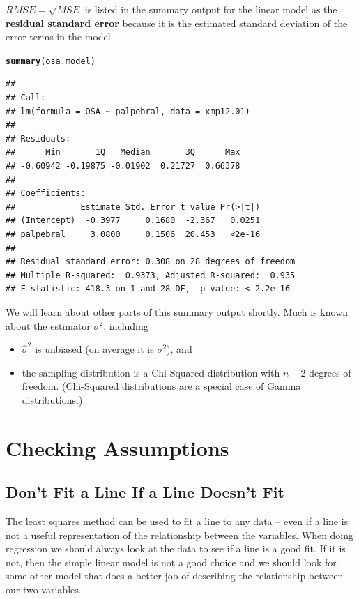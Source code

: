 \documentclass[twoside]{book}\usepackage[]{graphicx}\usepackage[]{xcolor}
\makeatletter
\newcommand{\hlstd}[1]{\textcolor[rgb]{0.345,0.345,0.345}{#1}}%
\newcommand{\hlkwd}[1]{\textcolor[rgb]{0.737,0.353,0.396}{\textbf{#1}}}%
\newenvironment{kframe}{%
 \def\at@end@of@kframe{}%
 \ifinner\ifhmode%
  \def\at@end@of@kframe{\end{minipage}}%
  \begin{minipage}{\columnwidth}%
 \fi\fi%
 \def\FrameCommand##1{\hskip\@totalleftmargin \hskip-\fboxsep
 \colorbox{shadecolor}{##1}\hskip-\fboxsep
     \hskip-\linewidth \hskip-\@totalleftmargin \hskip\columnwidth}%
 \MakeFramed {\advance\hsize-\width
   \@totalleftmargin\z@ \linewidth\hsize
   \@setminipage}}%
 {\par\unskip\endMakeFramed%
 \at@end@of@kframe}
\newenvironment{knitrout}{}{} %
\def\term#1{\textbf{#1}}
\makeatother
\begin{document}
$RMSE = \sqrt{MSE}$ is listed in the summary output for the linear model as the
\term{residual standard error} because it is the estimated standard deviation of 
the error terms in the model.
\begin{knitrout}
\color{fgcolor}\begin{kframe}
\begin{alltt}
\hlkwd{summary}\hlstd{(osa.model)}
\end{alltt}
\begin{verbatim}
## 
## Call:
## lm(formula = OSA ~ palpebral, data = xmp12.01)
## 
## Residuals:
##      Min       1Q   Median       3Q      Max 
## -0.60942 -0.19875 -0.01902  0.21727  0.66378 
## 
## Coefficients:
##             Estimate Std. Error t value Pr(>|t|)
## (Intercept)  -0.3977     0.1680  -2.367   0.0251
## palpebral     3.0800     0.1506  20.453   <2e-16
## 
## Residual standard error: 0.308 on 28 degrees of freedom
## Multiple R-squared:  0.9373,	Adjusted R-squared:  0.935 
## F-statistic: 418.3 on 1 and 28 DF,  p-value: < 2.2e-16
\end{verbatim}
\end{kframe}
\end{knitrout}
We will learn about other parts of this summary output shortly.
Much is known about the estimator $\sigma^2$, including 
\begin{itemize}
	\item $\hat \sigma^2$ is unbiased (on average it is $\sigma^2$), and 
	\item
		the sampling distribution is a Chi-Squared distribution with
		$n-2$ degrees of freedom.  
		(Chi-Squared distributions are a special case of Gamma distributions.)
\end{itemize}


\section{Checking Assumptions}

\subsection{Don't Fit a Line If a Line Doesn't Fit}

The least squares method can be used to fit a line to any data -- even if a line
is not a useful representation of the relationship between the variables.
When doing regression we should always look at the data to see if a line 
is a good fit.  If it is not, then the simple linear model is not a good choice and 
we should look for some other model that does a better job of describing the 
relationship between our two variables.  
\end{document}
